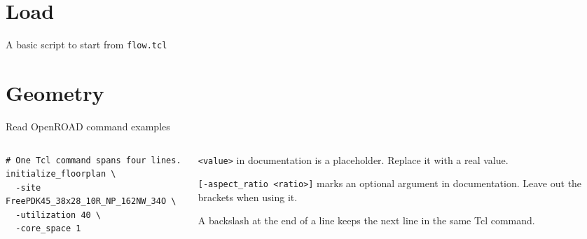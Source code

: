 \section{Load}
\begin{frame}[fragile]{A basic script to start from}
\textcolor{NordBlue}{\texttt{flow.tcl}}\par\vspace{12pt}

\end{frame}

\section{Geometry}
\begin{frame}[fragile]{Read OpenROAD command examples}
\begin{columns}[T,onlytextwidth]
\begin{column}{.49\textwidth}
\begin{lstlisting}[basicstyle=\ttfamily\fontsize{8}{11}\selectfont]
# One Tcl command spans four lines.
initialize_floorplan \
  -site FreePDK45_38x28_10R_NP_162NW_34O \
  -utilization 40 \
  -core_space 1
\end{lstlisting}
\end{column}
\begin{column}{.48\textwidth}
{\small \texttt{<value>} in documentation is a placeholder. Replace it with a real value.\par\vspace{9pt}
\texttt{[-aspect\_ratio <ratio>]} marks an optional argument in documentation. Leave out the brackets when using it.\par\vspace{9pt}
A backslash at the end of a line keeps the next line in the same Tcl command.\par}
\end{column}
\end{columns}
\end{frame}

